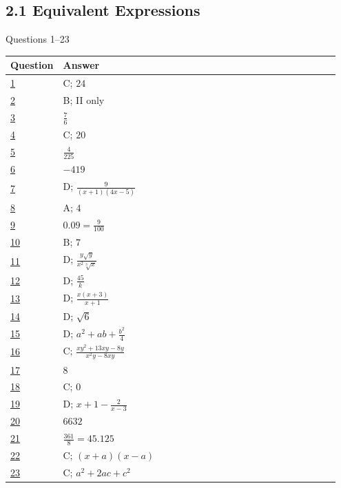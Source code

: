 \documentclass[11pt]{article}
\begin{document}
\subsection*{2.1 Equivalent Expressions}
{\small\color{NPgray}Questions 1--23}\par
\renewcommand{\arraystretch}{1.25}\begin{longtable}{@{}p{0.09\linewidth}p{0.86\linewidth}@{}}\toprule Question & Answer \\ \midrule\endhead
\hyperref[q1]{1} & C; $24$\\
\hyperref[q2]{2} & B; II only\\
\hyperref[q3]{3} & $\frac76$\\
\hyperref[q4]{4} & C; $20$\\
\hyperref[q5]{5} & $\frac4{225}$\\
\hyperref[q6]{6} & $-419$\\
\hyperref[q7]{7} & D; $\frac9{(x+1)(4x-5)}$\\
\hyperref[q8]{8} & A; $4$\\
\hyperref[q9]{9} & $0.09=\frac9{100}$\\
\hyperref[q10]{10} & B; $7$\\
\hyperref[q11]{11} & D; $\frac{y\sqrt y}{x^2\sqrt[3]x}$\\
\hyperref[q12]{12} & D; $\frac{45}{k}$\\
\hyperref[q13]{13} & D; $\frac{x(x+3)}{x+1}$\\
\hyperref[q14]{14} & D; $\sqrt6$\\
\hyperref[q15]{15} & D; $a^2+ab+\frac{b^2}{4}$\\
\hyperref[q16]{16} & C; $\frac{xy^2+13xy-8y}{x^2y-8xy}$\\
\hyperref[q17]{17} & $8$\\
\hyperref[q18]{18} & C; $0$\\
\hyperref[q19]{19} & D; $x+1-\frac2{x-3}$\\
\hyperref[q20]{20} & $6632$\\
\hyperref[q21]{21} & $\frac{361}{8}=45.125$\\
\hyperref[q22]{22} & C; $(x+a)(x-a)$\\
\hyperref[q23]{23} & C; $a^2+2ac+c^2$\\
\bottomrule\end{longtable}
\clearpage
\end{document}
